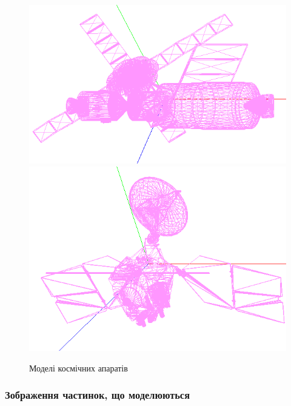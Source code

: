 \documentclass[a4paper,12pt]{article}
\begin{document}
\begin{figure}[!htp]
\centering
\includegraphics[scale=0.75]{screens/screenshot1.png}
\includegraphics[scale=0.75]{screens/screenshot2.png}
\caption{Моделі космічних апаратів}
\label{}
\end{figure}

\newpage
\subsubsection{Зображення частинок, що моделюються}
\end{document}
